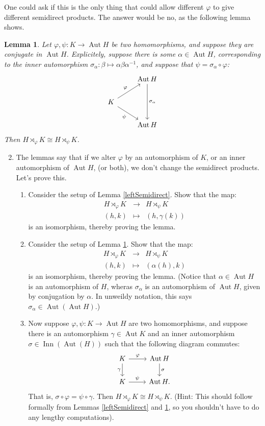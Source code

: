 \documentclass[11pt]{article}
\newtheorem{lemma}{Lemma}
\newcommand{\Aut}{\operatorname{Aut}}
\newcommand{\Inn}{\operatorname{Inn}}
\begin{document}
One could ask if this is the only thing that could allow different $\varphi$ to give different semidirect products.  The answer would be no, as the following lemma shows.
\begin{lemma}\label{rightSemidirect}
  Let $\varphi,\psi:K\to\Aut H$ be two homomorphisms, and suppose they are conjugate in $\Aut H$.  Explicitely, suppose there is some $\alpha\in\Aut H$, corresponding to the inner automorphism $\sigma_\alpha:\beta\mapsto \alpha\beta\alpha^{-1}$, and suppose that $\psi = \sigma_\alpha\circ\varphi$:
  \[
  \begin{tikzcd}
    &\Aut H\ar[dd,"\sigma_\alpha"]\\
    K\ar[ur,"\varphi"]\ar[dr,swap,"\psi"]\\
    &\Aut H
  \end{tikzcd}
  \]
  Then $H\rtimes_\varphi K\cong H\rtimes_\psi K$.
\end{lemma}
\begin{enumerate}
  \setcounter{enumi}{1}
  \item{The lemmas say that if we alter $\varphi$ by an automorphism of $K$, or an inner automorphism of $\Aut H$, (or both), we don't change the semidirect products.  Let's prove this.
  \begin{enumerate}
    \item{
    Consider the setup of Lemma \ref{leftSemidirect}.  Show that the map:
    \begin{eqnarray*}
      H\rtimes_\varphi K&\longrightarrow& H\rtimes_\psi K\\
      (h,k)&\mapsto&(h,\gamma(k))
    \end{eqnarray*}
    is an isomorphism, thereby proving the lemma.
    }
    \item{
    Consider the setup of Lemma \ref{rightSemidirect}.  Show that the map:
    \begin{eqnarray*}
      H\rtimes_\varphi K&\longrightarrow&H\rtimes_\psi K\\
      (h,k) &\mapsto& (\alpha(h),k)
    \end{eqnarray*}
    is an isomorphism, thereby proving the lemma.  (Notice that $\alpha\in\Aut H$ is an automorphism of $H$, wheras $\sigma_\alpha$ is an automorphism of $\Aut H$, given by conjugation by $\alpha$.  In unweildy notation, this says $\sigma_\alpha\in\Aut(\Aut H)$.)
    }
    \item{
    Now suppose $\varphi,\psi:K\to\Aut H$ are two homomorphisms, and suppose there is an automorphism $\gamma\in\Aut K$ and an inner automorphism $\sigma\in\Inn(\Aut(H))$ such that the following diagram commutes:
    \[
    \begin{tikzcd}
      K\ar[r,"\varphi"]\ar[d,swap,"\gamma"]&\Aut H\ar[d,"\sigma"]\\
      K\ar[r,"\psi"]&\Aut H.
    \end{tikzcd}
    \]
    That is, $\sigma\circ\varphi = \psi\circ\gamma$.  Then $H\rtimes_\varphi K\cong H\rtimes_\psi K$.  (Hint: This should follow formally from Lemmas \ref{leftSemidirect} and \ref{rightSemidirect}, so you shouldn't have to do any lengthy computations).
    }
  \end{enumerate}
  }
\end{enumerate}
\end{document}
